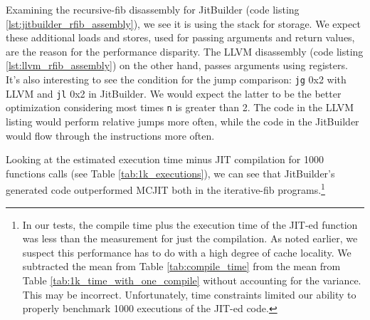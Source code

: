 Examining the recursive-fib disassembly for JitBuilder (code listing \ref{lst:jitbuilder_rfib_assembly}), we see it is using the stack for storage. We expect these additional loads and stores, used for passing arguments and return values, are the reason for the performance disparity.
The LLVM disassembly (code listing \ref{lst:llvm_rfib_assembly}) on the other hand, passes arguments using registers.
It's also interesting to see the condition for the jump comparison: \texttt{jg} 0x2 with LLVM and \texttt{jl} 0x2 in JitBuilder. 
We would expect the latter to be the better optimization considering most times \texttt{n} is greater than 2.
The code in the LLVM listing would perform relative jumps more often, while the code in the JitBuilder would flow through the instructions more often.

Looking at the estimated execution time minus JIT compilation for 1000 functions calls (see Table \ref{tab:1k_executions}), we can see that JitBuilder's generated code outperformed MCJIT both in the iterative-fib programs.\footnote{In our tests, the compile time plus the execution time of the JIT-ed function was less than the measurement for just the compilation. As noted earlier, we suspect this performance has to do with a high degree of cache locality. We subtracted the mean from Table \ref{tab:compile_time} from the mean from Table \ref{tab:1k_time_with_one_compile} without accounting for the variance. This may be incorrect. Unfortunately, time constraints limited our ability to properly benchmark 1000 executions of the JIT-ed code.}


